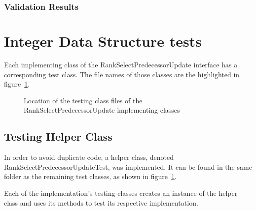 \subsubsection{Validation Results}

\begin{table}[H]
\centering

\caption{Validation summary of the Rank Lemma 1 function}
\label{tab:rankLemma1Validation}
\end{table}

\newpage
\section{Integer Data Structure tests} \label{sec:IntegerDataStructureTests}

Each implementing class of the {\ttfamily RankSelectPredecessorUpdate} interface has a corresponding test class. The file names of those classes are the highlighted in figure~\ref{fig:implementingClassesTestFilesTree}.

\begin{figure}[H]
    \caption{Location of the testing class files of the {\ttfamily RankSelectPredecessorUpdate} implementing classes}
    \label{fig:implementingClassesTestFilesTree}
\end{figure}

\subsection{Testing Helper Class}

In order to avoid duplicate code, a helper class, denoted {\ttfamily RankSelectPredecessorUpdateTest}, was implemented. It can be found in the same folder as the remaining test classes, as shown in figure~\ref{fig:implementingClassesTestFilesTree}.

Each of the implementation's testing classes creates an instance of the helper class and uses its methods to test its respective implementation.

